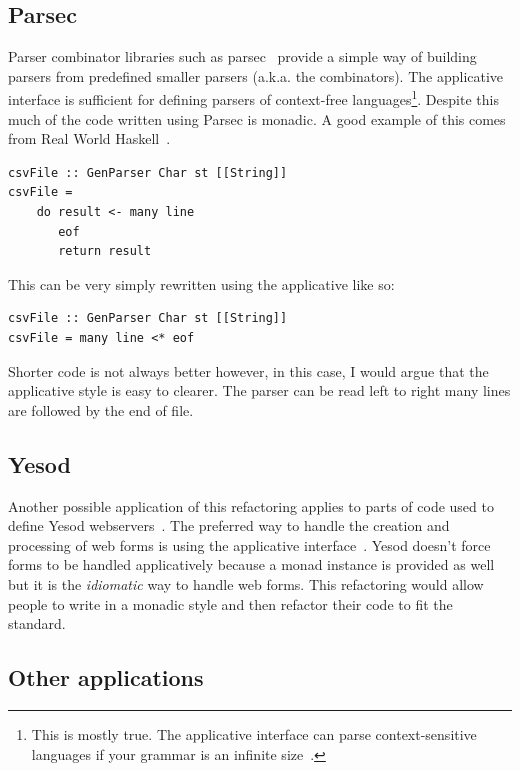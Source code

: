 \subsection{Parsec}
Parser combinator libraries such as parsec~\citep{parsec} provide a simple way of building parsers from predefined smaller parsers (a.k.a. the combinators). The applicative interface is sufficient for defining parsers of context-free languages\footnote{This is mostly true. The applicative interface can parse context-sensitive languages if your grammar is an infinite size~\citep{appContextSens}.}. Despite this much of the code written using Parsec is monadic. A good example of this comes from Real World Haskell~\citep{realWorldHaskell}.

\begin{lstlisting}[frame=tblr]
csvFile :: GenParser Char st [[String]]
csvFile = 
    do result <- many line
       eof
       return result
\end{lstlisting}

This can be very simply rewritten using the applicative like so:

\begin{lstlisting}[frame=tblr]
csvFile :: GenParser Char st [[String]]
csvFile = many line <* eof 
\end{lstlisting}      
 
 Shorter code is not always better however, in this case,  I would argue that the applicative style is easy to clearer. The parser can be read left to right many lines are followed by the end of file.
 
\subsection{Yesod}
Another possible application of this refactoring applies to parts of code used to define Yesod webservers~\citep{yesod}. The preferred way to handle the creation and processing of web forms is using the applicative interface~\citep{yesodBook}. Yesod doesn't force forms to be handled applicatively because a monad instance is provided as well but it is the \textit{idiomatic} way to handle web forms. This refactoring would allow people to write in a monadic style and then refactor their code to fit the standard.

\subsection{Other applications}
  

